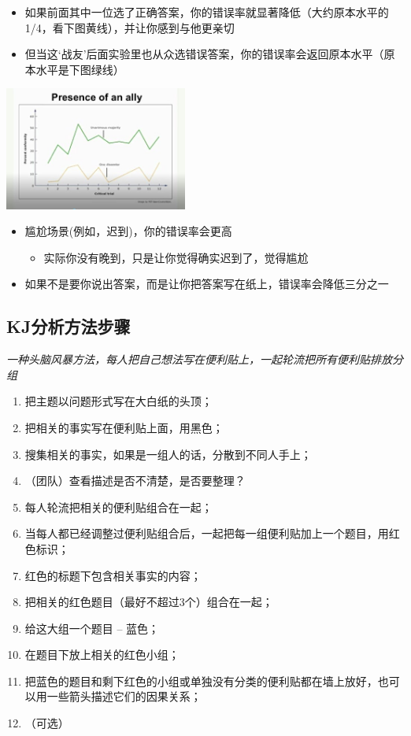 \begin{itemize}
\tightlist
\item
  如果前面其中一位选了正确答案，你的错误率就显著降低（大约原本水平的1/4，看下图黄线），并让你感到与他更亲切
\item
  但当这`战友'后面实验里也从众选错误答案，你的错误率会返回原本水平（原本水平是下图绿线）
\end{itemize}


\includegraphics[width=6cm]{Asch4Screenshot_2022-07-08_201502.jpg}

\begin{itemize}
\tightlist
\item
  尴尬场景(例如，迟到)，你的错误率会更高

  \begin{itemize}
  \tightlist
  \item
    实际你没有晚到，只是让你觉得确实迟到了，觉得尴尬
  \end{itemize}
\item
  如果不是要你说出答案，而是让你把答案写在纸上，错误率会降低三分之一
\end{itemize}

\hypertarget{kjux6b65ux9aa4}{%
\subsection{KJ分析方法步骤}\label{kjux6b65ux9aa4}}

\emph{一种头脑风暴方法，每人把自己想法写在便利贴上，一起轮流把所有便利贴排放分组}

\begin{enumerate}
\tightlist
\item
  把主题以问题形式写在大白纸的头顶；
\item
  把相关的事实写在便利贴上面，用黑色；
\item
  搜集相关的事实，如果是一组人的话，分散到不同人手上；
\item
  （团队）查看描述是否不清楚，是否要整理？
\item
  每人轮流把相关的便利贴组合在一起；
\item
  当每人都已经调整过便利贴组合后，一起把每一组便利贴加上一个题目，用红色标识；
\item
  红色的标题下包含相关事实的内容；
\item
  把相关的红色题目（最好不超过3个）组合在一起；
\item
  给这大组一个题目 -- 蓝色；
\item
  在题目下放上相关的红色小组；
\item
  把蓝色的题目和剩下红色的小组或单独没有分类的便利贴都在墙上放好，也可以用一些箭头描述它们的因果关系；
\item
  （可选）
\end{enumerate}


